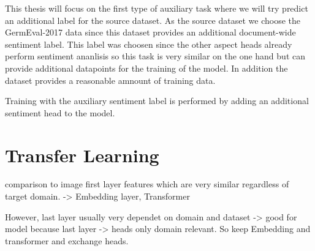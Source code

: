 This thesis will focus on the first type of auxiliary task where we will try predict an additional label for the source dataset. As the source dataset we choose the GermEval-2017 data since this dataset provides an additional document-wide sentiment label. This label was choosen since the other aspect heads already perform sentiment ananlisis so this task is very similar on the one hand but can provide additional datapoints for the training of the model. In addition the dataset provides a reasonable amnount of training data.

Training with the auxiliary sentiment label is performed by adding an additional sentiment head to the model.



\section{Transfer Learning}

comparison to image first layer features which are very similar regardless of target domain. \cite{Yosinski2014} -> Embedding layer, Transformer

However, last layer usually very dependet on domain and dataset -> good for model because last layer -> heads only domain relevant. So keep Embedding and transformer and exchange heads.

